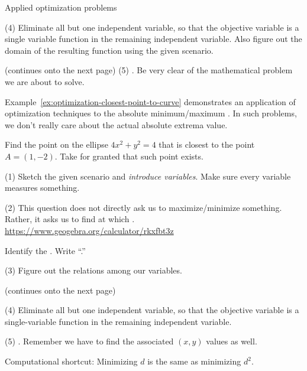 \documentclass[../main.tex]{subfiles}
\begin{document}
\begin{lesson}{Applied optimization problems}
\begin{example}
    (4) Eliminate all but one independent variable, so that the objective variable is a single variable function in the remaining independent variable. Also figure out the domain of the resulting function using the given scenario.

    \vfill{}{\footnotesize (continues onto the next page)} \clearpage
    (5) . Be very clear of the mathematical problem we are about to solve.
  \end{example}

  \medskip
  Example~\ref{ex:optimization-closest-point-to-curve} demonstrates an application of optimization techniques to  the absolute minimum/maximum . In such problems, we don't really care about the actual absolute extrema value. 

  \begin{example} \label{ex:optimization-closest-point-to-curve}
    Find the point on the ellipse \(4x^{2} + y^{2} = 4\) that is closest to the point \(A = (1,-2)\). Take for granted that such point exists.

    (1) Sketch the given scenario and \emph{introduce variables}. Make sure every variable measures something. 

    (2) This question does not directly ask us to maximize/minimize something. Rather, it asks us to find \underline{\hspace{1in}} at which \underline{\hspace{2in}}. \url{https://www.geogebra.org/calculator/rkxfbt3z}

    Identify the . Write ``\emph{}.''

    (3) Figure out the relations among our variables. 

    \vfill{}{\footnotesize (continues onto the next page)} \clearpage

    (4) Eliminate all but one independent variable, so that the objective variable is a single-variable function in the remaining independent variable. 

    (5) . Remember we have to find the associated \((x,y)\) values as well. 

    Computational shortcut: Minimizing \(d\) is the same as minimizing \(d^{2}\).
  \end{example}
  \clearpage


\end{lesson}
\end{document}
